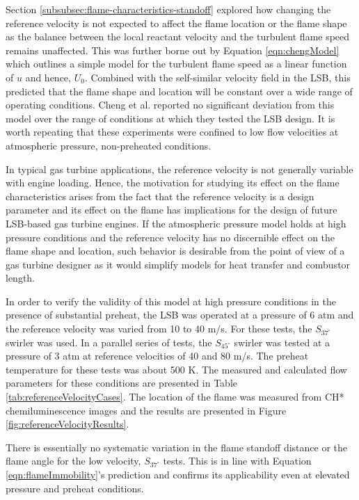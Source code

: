 Section \ref{subsubsec:flame-characteristics-standoff} explored how changing the reference velocity is not expected to affect the flame location or the flame shape as the balance between the local reactant velocity and the turbulent flame speed remains unaffected.
This was further borne out by Equation \ref{eqn:chengModel} which outlines a simple model for the turbulent flame speed as a linear function of \(u\) and hence, \(U_0\).
Combined with the self-similar velocity field in the LSB, this predicted that the flame shape and location will be constant over a wide range of operating conditions.
Cheng et al.\cite{2008-cheng-a} reported no significant deviation from this model over the range of conditions at which they tested the LSB design.
It is worth repeating that these experiments were confined to low flow velocities at atmospheric pressure, non-preheated conditions.

In typical gas turbine applications, the reference velocity is not generally variable with engine loading.
Hence, the motivation for studying its effect on the flame characteristics arises from the fact that the reference velocity is a design parameter and its effect on the flame has implications for the design of future LSB-based gas turbine engines.
If the atmospheric pressure model holds at high pressure conditions and the reference velocity has no discernible effect on the flame shape and location, such behavior is desirable from the point of view of a gas turbine designer as it would simplify models for heat transfer and combustor length.

In order to verify the validity of this model at high pressure conditions in the presence of substantial preheat, the LSB was operated at a pressure of 6 atm and the reference velocity was varied from 10 to 40 m/s.
For these tests, the \(S_{37^\circ}\) swirler was used.
In a parallel series of tests, the \(S_{45^\circ}\) swirler was tested at a pressure of 3 atm at reference velocities of 40 and 80 m/s.
The preheat temperature for these tests was about 500 K.
The measured and calculated flow parameters for these conditions are presented in Table \ref{tab:referenceVelocityCases}.
The location of the flame was measured from CH* chemiluminescence images and the results are presented in Figure \ref{fig:referenceVelocityResults}.




There is essentially no systematic variation in the flame standoff distance or the flame angle for the low velocity, \(S_{37^\circ}\) tests.
This is in line with Equation \ref{eqn:flameImmobility}'s prediction and confirms its applicability even at elevated pressure and preheat conditions.

